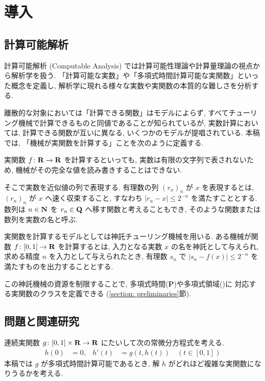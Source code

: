 \section{導入}

\subsection{計算可能解析}

計算可能解析 (Computable Analysis) では計算可能性理論や計算量理論の視点から解析学を扱う. 
「計算可能な実数」や「多項式時間計算可能な実関数」といった概念を定義し, 
解析学に現れる様々な実数や実関数の本質的な難しさを分析する. 

離散的な対象においては「計算できる関数」はモデルによらず,
すべてチューリング機械で計算できるものと同値であることが知られているが,
実数計算においては, 計算できる関数が互いに異なる, いくつかのモデルが提唱されている.
本稿では,
「機械が実関数を計算する」ことを次のように定義する.

実関数 $f \colon \mathbf R \to \mathbf R$ を計算するといっても,
実数は有限の文字列で表されないため,
機械がその完全な値を読み書きすることはできない.

そこで実数を近似値の列で表現する.
有理数の列 $(r_n)_n$ が $x$ を表現するとは,
$(r_n)_n$ が $x$ へ速く収束すること, 
すなわち $|r_n - x| \le 2^{-n}$ を満たすこととする.
数列は $n \in \mathbf N$ を $r_n \in \mathbf Q$ へ移す関数と考えることもでき,
そのような関数または数列を実数の名と呼ぶ.

実関数を計算するモデルとしては神託チューリング機械を用いる. 
ある機械が関数 $f \colon [0, 1] \to \mathbf R$ を計算するとは,
入力となる実数 $x$ の名を神託として与えられ,
求める精度 $n$ を入力として与えられたとき,
有理数 $s_n$ で $|s_n - f(x)| \le 2^{-n}$ を満たすものを出力することとする.

この神託機械の資源を制限することで, 多項式時間({\bf P})や多項式領域(\PSPACE)に
対応する実関数のクラスを定義できる (\ref{section: preliminaries}節).

\subsection{問題と関連研究}

連続実関数 $g \colon [0,1] \times \mathbf R \to \mathbf R$ にたいして次の常微分方程式を考える. 
\begin{align}
 \label{eq:ode}
 h(0) & = 0, &
 h'(t) & = g(t,h(t)) \quad (t \in [0,1])
\end{align}
本稿では $g$ が多項式時間計算可能であるとき, 
解 $h$ がどれほど複雑な実関数になりうるかを考える.

